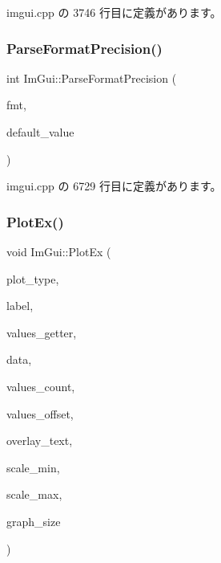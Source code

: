  imgui.\+cpp の 3746 行目に定義があります。

\mbox{\label{namespace_im_gui_a40943047a2f8cad978fabffcbd26805f}} 
\subsubsection{\texorpdfstring{Parse\+Format\+Precision()}{ParseFormatPrecision()}}
{\footnotesize\ttfamily int Im\+Gui\+::\+Parse\+Format\+Precision (\begin{DoxyParamCaption}\item[{const char $\ast$}]{fmt,  }\item[{int}]{default\+\_\+value }\end{DoxyParamCaption})}



 imgui.\+cpp の 6729 行目に定義があります。

\mbox{\label{namespace_im_gui_a0a18ae07b294d5667f95a5c003d2efb6}} 
\subsubsection{\texorpdfstring{Plot\+Ex()}{PlotEx()}}
{\footnotesize\ttfamily void Im\+Gui\+::\+Plot\+Ex (\begin{DoxyParamCaption}\item[{\mbox{\hyperlink{imgui__internal_8h_a9d5efcdd8895aa3544f1e8ce366c2728}{Im\+Gui\+Plot\+Type}}}]{plot\+\_\+type,  }\item[{const char $\ast$}]{label,  }\item[{float($\ast$)(void $\ast$data, int idx)}]{values\+\_\+getter,  }\item[{void $\ast$}]{data,  }\item[{int}]{values\+\_\+count,  }\item[{int}]{values\+\_\+offset,  }\item[{const char $\ast$}]{overlay\+\_\+text,  }\item[{float}]{scale\+\_\+min,  }\item[{float}]{scale\+\_\+max,  }\item[{\mbox{\hyperlink{struct_im_vec2}{Im\+Vec2}}}]{graph\+\_\+size }\end{DoxyParamCaption})}



